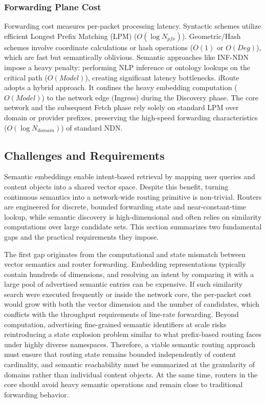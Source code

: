 \documentclass[conference]{IEEEtran}
\newcommand{\sysname}{iRoute}
\begin{document}
\subsubsection{Forwarding Plane Cost}
Forwarding cost measures per-packet processing latency.
Syntactic schemes utilize efficient Longest Prefix Matching (LPM) ($O(\log N_{pfx})$).
Geometric/Hash schemes involve coordinate calculations or hash operations ($O(1)$ or $O(Deg)$), which are fast but semantically oblivious.
Semantic approaches like INF-NDN impose a heavy penalty: performing NLP inference or ontology lookups on the critical path ($O(Model)$), creating significant latency bottlenecks.
\sysname{} adopts a hybrid approach. It confines the heavy embedding computation ($O(Model)$) to the network edge (Ingress) during the Discovery phase. The core network and the subsequent Fetch phase rely solely on standard LPM over domain or provider prefixes, preserving the high-speed forwarding characteristics ($O(\log N_{domain})$) of standard NDN.


\subsection{Challenges and Requirements}
\label{sec:challenges}

Semantic embeddings enable intent-based retrieval by mapping user queries and content objects into a shared vector space. Despite this benefit, turning continuous semantics into a network-wide routing primitive is non-trivial. Routers are engineered for discrete, bounded forwarding state and near-constant-time lookup, while semantic discovery is high-dimensional and often relies on similarity computations over large candidate sets. This section summarizes two fundamental gaps and the practical requirements they impose.

The first gap originates from the computational and state mismatch between vector semantics and router forwarding. Embedding representations typically contain hundreds of dimensions, and resolving an intent by comparing it with a large pool of advertised semantic entries can be expensive. If such similarity search were executed frequently or inside the network core, the per-packet cost would grow with both the vector dimension and the number of candidates, which conflicts with the throughput requirements of line-rate forwarding. Beyond computation, advertising fine-grained semantic identifiers at scale risks reintroducing a state explosion problem similar to what prefix-based routing faces under highly diverse namespaces. Therefore, a viable semantic routing approach must ensure that routing state remains bounded independently of content cardinality, and semantic reachability must be summarized at the granularity of domains rather than individual content objects. At the same time, routers in the core should avoid heavy semantic operations and remain close to traditional forwarding behavior.
\end{document}

